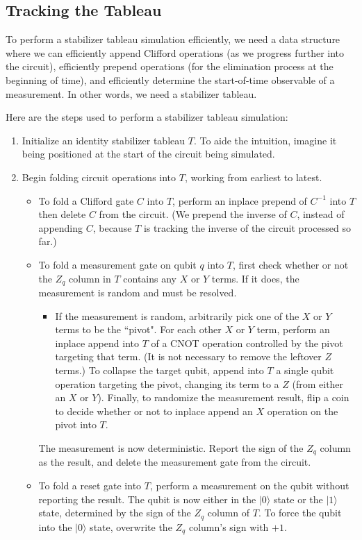 \documentclass[onecolumn,unpublished]{quantumarticle}
\theoremstyle{definition}
\theoremstyle{definition}
\theoremstyle{definition}
\begin{document}
\subsection{Tracking the Tableau}

To perform a stabilizer tableau simulation efficiently, we need a data structure where we can efficiently append Clifford operations (as we progress further into the circuit), efficiently prepend operations (for the elimination process at the beginning of time), and efficiently determine the start-of-time observable of a measurement.
In other words, we need a stabilizer tableau.

Here are the steps used to perform a stabilizer tableau simulation:

\begin{enumerate}
    \item Initialize an identity stabilizer tableau $T$.
    To aide the intuition, imagine it being positioned at the start of the circuit being simulated.
    \item Begin folding circuit operations into $T$, working from earliest to latest.
    \begin{itemize}
        \item To fold a Clifford gate $C$ into $T$, perform an inplace prepend of $C^{-1}$ into $T$ then delete $C$ from the circuit.
        (We prepend the inverse of $C$, instead of appending $C$, because $T$ is tracking the inverse of the circuit processed so far.)
        \item To fold a measurement gate on qubit $q$ into $T$, first check whether or not the $Z_q$ column in $T$ contains any $X$ or $Y$ terms.
        If it does, the measurement is random and must be resolved.
        \begin{itemize}
            \item If the measurement is random, arbitrarily pick one of the $X$ or $Y$ terms to be the ``pivot".
            For each other $X$ or $Y$ term, perform an inplace append into $T$ of a CNOT operation controlled by the pivot targeting that term.
            (It is not necessary to remove the leftover $Z$ terms.)
            To collapse the target qubit, append into $T$ a single qubit operation targeting the pivot, changing its term to a $Z$ (from either an $X$ or $Y$).
            Finally, to randomize the measurement result, flip a coin to decide whether or not to inplace append an $X$ operation on the pivot into $T$.
        \end{itemize}
        The measurement is now deterministic.
        Report the sign of the $Z_q$ column as the result, and delete the measurement gate from the circuit.
        \item To fold a reset gate into $T$, perform a measurement on the qubit without reporting the result.
        The qubit is now either in the $|0\rangle$ state or the $|1\rangle$ state, determined by the sign of the $Z_q$ column of $T$.
        To force the qubit into the $|0\rangle$ state, overwrite the $Z_q$ column's sign with $+1$.
    \end{itemize}
\end{enumerate}
\end{document}

